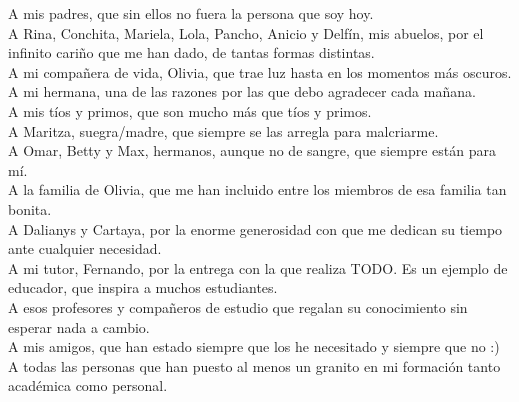 \begin{acknowledgements}
    A mis padres, que sin ellos no fuera la persona que soy hoy. \\

    A Rina, Conchita, Mariela, Lola, Pancho, Anicio y Delfín, mis abuelos, 
    por el infinito cariño que me han dado, de tantas formas distintas. \\

    A mi compañera de vida, Olivia, que trae luz hasta en los momentos más oscuros. \\

    A mi hermana, una de las razones por las que debo agradecer cada mañana. \\

    A mis tíos y primos, que son mucho más que tíos y primos. \\

    A Maritza, suegra/madre, que siempre se las arregla para malcriarme. \\
    
    A Omar, Betty y Max, hermanos, aunque no de sangre, que siempre están para mí. \\ 

    A la familia de Olivia, que me han incluido entre los miembros de esa familia tan bonita. \\

    A Dalianys y Cartaya, por la enorme generosidad con que me dedican su tiempo ante cualquier 
    necesidad. \\ 

    A mi tutor, Fernando, por la entrega con la que realiza TODO. Es un ejemplo de educador, que 
    inspira a muchos estudiantes. \\ 

    A esos profesores y compañeros de estudio que regalan su conocimiento sin esperar nada a cambio. \\

    A mis amigos, que han estado siempre que los he necesitado y siempre que no :) \\

    A todas las personas que han puesto al menos un granito en mi formación tanto académica como personal.  


\end{acknowledgements}